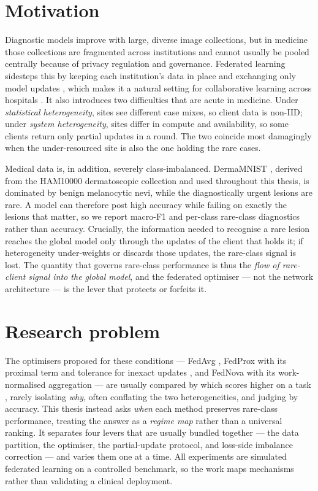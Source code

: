 \documentclass[11pt,a4paper]{report}
\begin{document}
\section{Motivation}
\label{sec:intro-motivation}

Diagnostic models improve with large, diverse image collections, but in medicine
those collections are fragmented across institutions and cannot usually be pooled
centrally because of privacy regulation and governance. Federated learning
sidesteps this by keeping each institution's data in place and exchanging only
model updates \citep{mcmahan2017fedavg, rieke2020future, sheller2020medicalfl},
which makes it a natural setting for collaborative learning across hospitals
\citep{kairouz2021advances}. It also introduces two difficulties that are acute
in medicine. Under \emph{statistical heterogeneity}, sites see different case
mixes, so client data is non-IID; under \emph{system heterogeneity}, sites differ
in compute and availability, so some clients return only partial updates in a
round. The two coincide most damagingly when the under-resourced site is also the
one holding the rare cases.

Medical data is, in addition, severely class-imbalanced. DermaMNIST
\citep{yang2023medmnistv2}, derived from the HAM10000 dermatoscopic collection
\citep{tschandl2018ham10000} and used throughout this thesis, is dominated by
benign melanocytic nevi, while the diagnostically urgent lesions are rare. A model
can therefore post high accuracy while failing on exactly the lesions that matter,
so we report macro-F1 and per-class rare-class diagnostics rather than accuracy.
Crucially, the information needed to recognise a rare lesion reaches the global
model only through the updates of the client that holds it; if heterogeneity
under-weights or discards those updates, the rare-class signal is lost. The
quantity that governs rare-class performance is thus the \emph{flow of
rare-client signal into the global model}, and the federated optimiser --- not the
network architecture --- is the lever that protects or forfeits it.

\section{Research problem}
\label{sec:intro-problem}

The optimisers proposed for these conditions --- FedAvg \citep{mcmahan2017fedavg},
FedProx with its proximal term and tolerance for inexact updates
\citep{li2020fedprox}, and FedNova with its work-normalised aggregation
\citep{wang2020fednova} --- are usually compared by which scores higher on a task
\citep{li2022niidbench}, rarely isolating \emph{why}, often conflating the two
heterogeneities, and judging by accuracy. This thesis instead asks \emph{when}
each method preserves rare-class performance, treating the answer as a
\emph{regime map} rather than a universal ranking. It separates four levers that
are usually bundled together --- the data partition, the optimiser, the
partial-update protocol, and loss-side imbalance correction --- and varies them one
at a time. All experiments are simulated federated learning on a controlled
benchmark, so the work maps mechanisms rather than validating a clinical
deployment.
\end{document}
